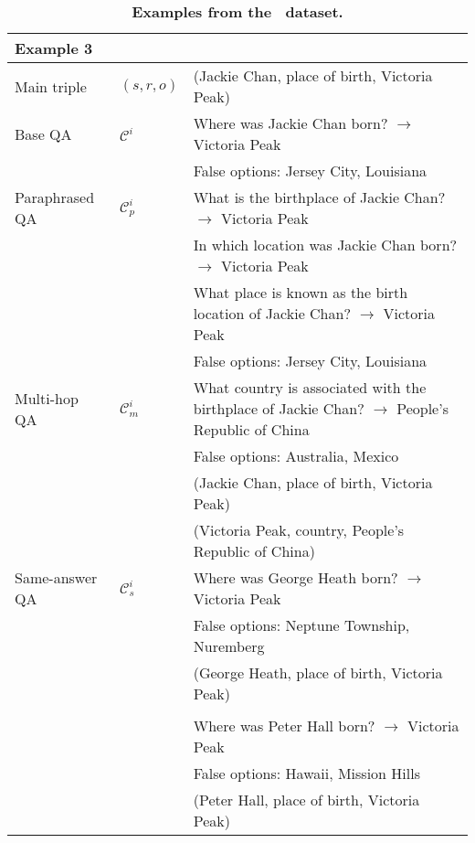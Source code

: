 \begin{table*}[t]
{\begin{tabular}{lll}
\rowcolor{gray!20} \textbf{Example 3} &  &  \\ \midrule
Main triple & \( (s,r,o) \)           & (Jackie Chan, place of birth, Victoria Peak)                                                                               \\ \midrule
Base QA & \( \mathcal{C}^{i} \)   & Where was Jackie Chan born? \(\rightarrow\) Victoria Peak                                                   \\ 
& & False options: Jersey City, Louisiana \\ \midrule
Paraphrased QA & \( \mathcal{C}_{p}^{i} \)  & What is the birthplace of Jackie Chan? \(\rightarrow\) Victoria Peak \\
& & In which location was Jackie Chan born? \(\rightarrow\) Victoria Peak \\
& & What place is known as the birth location of Jackie Chan? \(\rightarrow\) Victoria Peak \\
& & False options: Jersey City, Louisiana \\ \midrule
Multi-hop QA & \( \mathcal{C}_{m}^{i} \)   & What country is associated with the birthplace of Jackie Chan? \(\rightarrow\) People's Republic of China \\ 
& & False options: Australia, Mexico \\
                        & & (Jackie Chan, place of birth, Victoria Peak) \\ 
                        & & (Victoria Peak, country, People's Republic of China) \\ \midrule
Same-answer QA & \( \mathcal{C}_{s}^{i} \)   & Where was George Heath born? \(\rightarrow\) Victoria Peak                                                          \\ 
& & False options: Neptune Township, Nuremberg \\
& & (George Heath, place of birth, Victoria Peak) \\ 
& & \\
& & Where was Peter Hall born? \(\rightarrow\) Victoria Peak \\
& & False options: Hawaii, Mission Hills \\
& & (Peter Hall, place of birth, Victoria Peak) \\

\bottomrule
\end{tabular}
}
\caption{\textbf{Examples from the \ourdata~dataset.}}
\label{tab:more_examples}
\end{table*}

